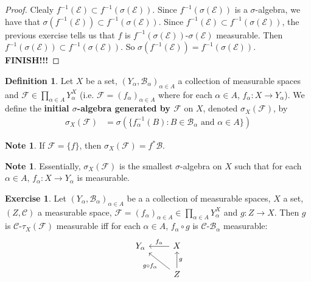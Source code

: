 \documentclass{book}
\theoremstyle{definition}
\newtheorem{defn}[definition]{Definition}
\newtheorem{note}[definition]{Note}
\newtheorem{ex}[definition]{Exercise}
\newcommand{\al}{\alpha}
\newcommand{\sig}{\sigma}
\newcommand{\MB}{\mathcal{B}}
\newcommand{\MC}{\mathcal{C}}
\newcommand{\ME}{\mathcal{E}}
\newcommand{\MF}{\mathcal{F}}
\newcommand{\ld}[1]{\label{defn:#1}}
\DeclareMathOperator*{\0}{\mbf{0}}
\DeclareMathOperator*{\1}{\mbf{1}}
\begin{document}
	\begin{proof}
		Clealy $f^{-1}(\ME) \subset f^{-1}(\sig(\ME))$. Since $f^{-1}(\sig(\ME))$ is a $\sig$-algebra, we have that $\sig(f^{-1}(\ME)) \subset f^{-1}(\sig(\ME))$. Since $f^{-1}(\ME) \subset f^{-1}(\sig(\ME))$, the previous exercise tells us that $f$ is $f^{-1}(\sig(\ME))$-$\sig(\ME)$ measurable. Then $f^{-1}(\sig(\ME)) \subset f^{-1}(\sig(\ME))$. So $\sig(f^{-1}(\ME)) = f^{-1}(\sig(\ME))$.  \\
		\textbf{FINISH!!!}
	\end{proof}
	
	\begin{defn} \ld{}
		Let $X$ be a set, $(Y_{\al}, \MB_{\al})_{\al \in A}$ a collection of measurable spaces and $\MF \in \prod \limits_{\al \in A}Y_{\al}^X$ (i.e. $\MF = (f_{\al})_{\al \in A}$ where for each $\al \in A$, $f_{\al}:X \rightarrow Y_{\al}$). We define the \textbf{initial $\sig$-algebra generated by $\MF$} on $X$, denoted $\sig_X(\MF)$, by 
		\begin{align*}
			\sig_X(\MF) 
			&= \sig(\{f_{\al}^{-1}(B): B \in \MB_{\al} \text{ and } \al \in A \})
		\end{align*}	 
	\end{defn}
	
	\begin{note}
		If $\MF = \{f\}$, then $\sig_X(\MF) = f^*\MB$.
	\end{note}
	
	\begin{note}
		Essentially, $\sig_X(\MF)$ is the smallest $\sig$-algebra on $X$ such that for each $\al \in A$, $f_{\al}:X \rightarrow Y_{\al}$ is measurable. 
	\end{note}

	\begin{ex}
		Let $(Y_{\al}, \MB_{\al})_{\al \in A}$ be a a collection of measurable spaces, $X$ a set, $(Z, \MC)$ a measurable space, $\MF = (f_{\al})_{\al \in A} \in \prod \limits_{\al \in A}Y_{\al}^X$ and $g: Z \rightarrow X$. Then $g$ is $\MC$-$\tau_X(\MF)$ measurable iff for each $\al \in A$, $f_{\al} \circ g$ is $\MC$-$\MB_{\al}$ measurable:
		\[ \begin{tikzcd}
			Y_{\al}	
			& X  \arrow[l, "f_{\al}"'] \\
			& Z \arrow[ul, "g \circ f_{\al}"]  \arrow[u, "g"']
		\end{tikzcd}
		\]
	\end{ex}
	
\end{document}
